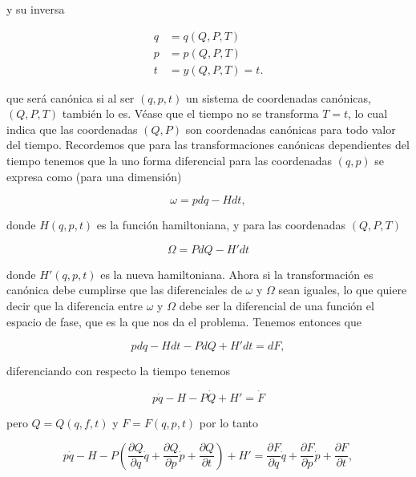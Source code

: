 \documentclass[a4paper,10pt]{article}
\numberwithin{equation}{section}
\begin{document}
y su inversa 

\begin{align*}
 q &= q(Q,P,T) \\
 p &= p(Q,P,T) \\
 t &= y(Q,P,T) = t.
\end{align*}

que será canónica si al ser $(q,p,t)$ un sistema de coordenadas canónicas, $(Q,P,T)$ 
también lo es. Véase que el tiempo no se transforma $T = t$, lo cual indica que 
las coordenadas $(Q,P)$ son coordenadas canónicas para todo valor del tiempo. Recordemos 
que para las transformaciones canónicas dependientes del tiempo tenemos que la 
uno forma diferencial para las coordenadas $(q,p)$ se expresa como (para una dimensión)

\begin{equation}
 \omega = pdq - Hdt,
\end{equation}

donde $H(q,p,t)$ es la función hamiltoniana, y para las coordenadas $(Q,P,T)$ 

\begin{equation}
 \Omega = PdQ - H'dt
\end{equation}

donde $H'(q,p,t)$ es la nueva hamiltoniana. Ahora si la transformación es canónica 
debe cumplirse que las diferenciales de $\omega$ y $\Omega$ sean iguales, lo que 
quiere decir que la diferencia entre $\omega$ y $\Omega$ debe ser la diferencial 
de una función el espacio de fase, que es la que nos da el problema. Tenemos entonces 
que 

\begin{equation}
 pdq - Hdt - PdQ + H'dt = dF,
\end{equation}

diferenciando con respecto la tiempo tenemos 

\begin{equation}
 p\dot{q} - H - P\dot{Q} + H' = \dot{F}
\end{equation}

pero $Q = Q(q,f,t)$ y  $F = F(q,p,t)$ por lo tanto 

\begin{equation}
 p\dot{q} - H - P\left(\frac{\partial Q}{\partial q}\dot{q} 
 + \frac{\partial Q}{\partial p}\dot{p} + \frac{\partial Q}{\partial t} \right) + 
 H' = \frac{\partial F}{\partial q}\dot{q} 
 + \frac{\partial F}{\partial p}\dot{p} + \frac{\partial F}{\partial t},
\end{equation}
\end{document}
